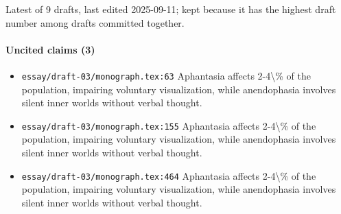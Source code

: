\documentclass[11pt]{article}
\newcommand{\loc}[1]{{\small\color{muted}\texttt{#1}}}
\begin{document}
Latest of 9 drafts, last edited 2025-09-11; kept because it has the highest draft number among drafts committed together.

\paragraph{Uncited claims (3)}
\begin{itemize}
\item \loc{essay/\allowbreak{}draft-03/\allowbreak{}monograph.tex:63} Aphantasia affects 2-4\textbackslash{}\% of the population, impairing voluntary visualization, while anendophasia involves silent inner worlds without verbal thought.
\item \loc{essay/\allowbreak{}draft-03/\allowbreak{}monograph.tex:155} Aphantasia affects 2-4\textbackslash{}\% of the population, impairing voluntary visualization, while anendophasia involves silent inner worlds without verbal thought.
\item \loc{essay/\allowbreak{}draft-03/\allowbreak{}monograph.tex:464} Aphantasia affects 2-4\textbackslash{}\% of the population, impairing voluntary visualization, while anendophasia involves silent inner worlds without verbal thought.
\end{itemize}
\end{document}
